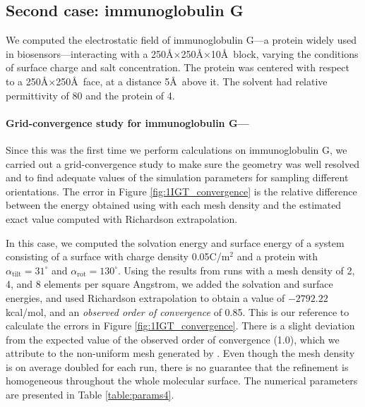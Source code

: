 \subsection{Second case: immunoglobulin G} \label{sec:IGT}


We computed the electrostatic field of immunoglobulin G---a protein widely used in biosensors---interacting with a 250\AA$\times$250\AA$\times$10\AA\ block, varying the conditions of surface charge and salt concentration. The protein was centered with respect to a  250\AA$\times$250\AA\ face, at a distance 5\AA\ above it. The solvent had relative permittivity of 80 and the protein of 4.

\medskip

 \paragraph*{Grid-convergence study for immunoglobulin G---}

Since this was the first time we perform calculations on immunoglobulin G, we carried out a grid-convergence study to make sure the geometry was well resolved and to find adequate values of the simulation parameters for sampling different orientations. The error in Figure \ref{fig:1IGT_convergence} is the relative difference between the energy obtained using \pygbe with each mesh density and the estimated exact value computed with Richardson extrapolation.

In this case, we computed the solvation energy and surface energy of a system consisting of a surface with charge density 0.05C/m$^2$ and a protein with $\alpha_{\text{tilt}} = 31^{\circ}$ and $\alpha_{\text{rot}} = 130^{\circ}$. Using the results from runs with a mesh density of 2, 4, and 8 elements per square Angstrom, we added the solvation and surface energies, and used Richardson extrapolation to obtain a value of $-2792.22$kcal/mol, and an \emph{observed order of convergence} of 0.85. This is our reference to calculate the errors in Figure \ref{fig:1IGT_convergence}. There is a slight deviation from the expected value of the observed order of convergence (1.0), which we attribute to the non-uniform mesh generated by \msms. Even though the mesh density is on average doubled for each run, there is no guarantee that the refinement is homogeneous throughout the whole molecular surface. The numerical parameters are presented in Table \ref{table:params4}.

